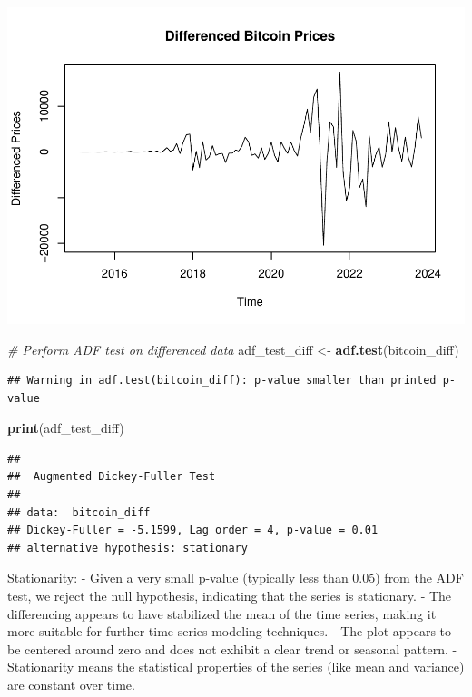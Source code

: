 \documentclass[
]{book}
\newenvironment{Shaded}{\begin{snugshade}}{\end{snugshade}}
\newcommand{\CommentTok}[1]{\textcolor[rgb]{0.56,0.35,0.01}{\textit{#1}}}
\newcommand{\FunctionTok}[1]{\textcolor[rgb]{0.13,0.29,0.53}{\textbf{#1}}}
\newcommand{\NormalTok}[1]{#1}
\newcommand{\OtherTok}[1]{\textcolor[rgb]{0.56,0.35,0.01}{#1}}
\begin{document}
\includegraphics{bookdown-demo_files/figure-latex/unnamed-chunk-37-1.pdf}

\begin{Shaded}
\begin{Highlighting}[]
\CommentTok{\# Perform ADF test on differenced data}
\NormalTok{adf\_test\_diff }\OtherTok{\textless{}{-}} \FunctionTok{adf.test}\NormalTok{(bitcoin\_diff)}
\end{Highlighting}
\end{Shaded}

\begin{verbatim}
## Warning in adf.test(bitcoin_diff): p-value smaller than printed p-value
\end{verbatim}

\begin{Shaded}
\begin{Highlighting}[]
\FunctionTok{print}\NormalTok{(adf\_test\_diff)}
\end{Highlighting}
\end{Shaded}

\begin{verbatim}
## 
##  Augmented Dickey-Fuller Test
## 
## data:  bitcoin_diff
## Dickey-Fuller = -5.1599, Lag order = 4, p-value = 0.01
## alternative hypothesis: stationary
\end{verbatim}

Stationarity:
- Given a very small p-value (typically less than 0.05) from the ADF test, we reject the null hypothesis, indicating that the series is stationary.
- The differencing appears to have stabilized the mean of the time series, making it more suitable for further time series modeling techniques.
- The plot appears to be centered around zero and does not exhibit a clear trend or seasonal pattern.
- Stationarity means the statistical properties of the series (like mean and variance) are constant over time.
\end{document}
